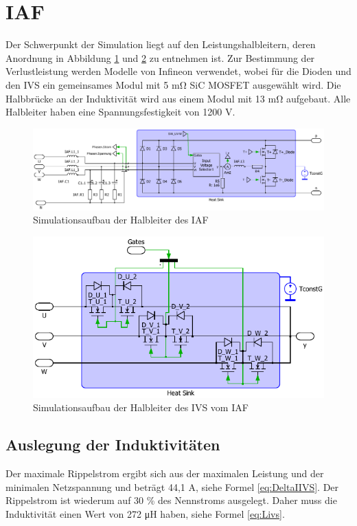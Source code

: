 \section{IAF}
	Der Schwerpunkt der Simulation liegt auf den Leistungshalbleitern, deren Anordnung in Abbildung \ref{fig:iafplecsmain} und \ref{fig:iafplecsivs} zu entnehmen ist. Zur Bestimmung der Verlustleistung werden Modelle von Infineon verwendet, wobei für die Dioden und den \gls{IVS} ein gemeinsames Modul mit 5 \si{\milli \ohm} \gls{SiC} \gls{MOSFET} ausgewählt wird. Die Halbbrücke an der Induktivität wird aus einem Modul mit 13 \si{\milli \ohm} aufgebaut. Alle Halbleiter haben eine Spannungsfestigkeit von 1200 V.
	\begin{figure}
		\centering
		\includegraphics[width=1\linewidth]{content/Grafiken/IAF_Plecs_main}
		\caption{Simulationsaufbau der Halbleiter des IAF}
		\label{fig:iafplecsmain}
	\end{figure}
	\begin{figure}
		\centering
		\includegraphics[width=1\linewidth]{content/Grafiken/IAF_Plecs_IVS}
		\caption{Simulationsaufbau der Halbleiter des IVS vom IAF}
		\label{fig:iafplecsivs}
	\end{figure}
	

	\subsection{Auslegung der Induktivitäten}
	Der maximale Rippelstrom ergibt sich aus der maximalen Leistung und der minimalen Netzspannung und beträgt 44,1 \si{\A}, siehe Formel \ref{eq:DeltaIIVS}. Der Rippelstrom ist wiederum auf 30 \% des Nennstroms ausgelegt. Daher muss die Induktivität einen Wert von 272 \si{\micro \henry} haben, siehe Formel \ref{eq:Livs}. 
		
